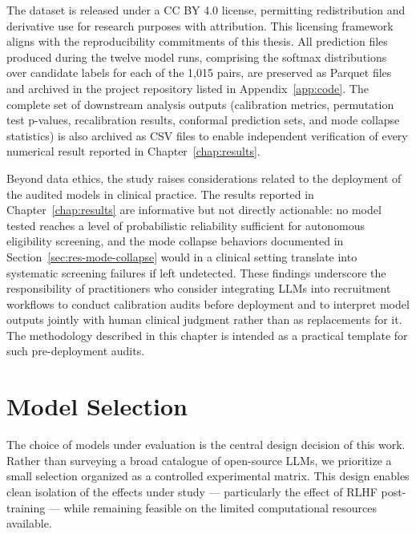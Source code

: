 The dataset is released under a CC BY 4.0 license, permitting 
redistribution and derivative use for research purposes with attribution. 
This licensing framework aligns with the reproducibility commitments of 
this thesis. All prediction files produced during the twelve model runs, 
comprising the softmax distributions over candidate labels for each of 
the 1{,}015 pairs, are preserved as Parquet files and archived in the 
project repository listed in Appendix~\ref{app:code}. The complete set 
of downstream analysis outputs (calibration metrics, permutation test 
p-values, recalibration results, conformal prediction sets, and mode 
collapse statistics) is also archived as CSV files to enable independent 
verification of every numerical result reported in Chapter~\ref{chap:results}.

Beyond data ethics, the study raises considerations related to the 
deployment of the audited models in clinical practice. The results 
reported in Chapter~\ref{chap:results} are informative but not 
directly actionable: no model tested reaches a level of probabilistic 
reliability sufficient for autonomous eligibility screening, and the 
mode collapse behaviors documented in Section~\ref{sec:res-mode-collapse} 
would in a clinical setting translate into systematic screening failures 
if left undetected. These findings underscore the responsibility of 
practitioners who consider integrating LLMs into recruitment workflows 
to conduct calibration audits before deployment and to interpret model 
outputs jointly with human clinical judgment rather than as replacements 
for it. The methodology described in this chapter is intended as a 
practical template for such pre-deployment audits.

\section{Model Selection}
\label{sec:met-models}

The choice of models under evaluation is the central design decision of this 
work. Rather than surveying a broad catalogue of open-source LLMs, we 
prioritize a small selection organized as a controlled experimental matrix. 
This design enables clean isolation of the effects under study --- 
particularly the effect of RLHF post-training --- while remaining feasible on 
the limited computational resources available.

